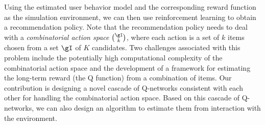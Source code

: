 \documentclass{article} %
\newcommand{\shuang}[1]{{\color{purple}{\bf\sf[ #1]}}}
\newcommand{\Li}[1]{{\color{cyan}{\bf\sf [Li: #1]}}}
\begin{document}
Using the estimated user behavior model and the corresponding reward function as the simulation environment, we can then use reinforcement learning to obtain a recommendation policy. Note that the recommendation policy needs to deal with a {\it combinatorial action space} $\gI \choose k$, where each action is a set of $k$ items chosen from a \Li{\st{larger} large} set $\gI$ of $K$ candidates. \Li{$K$ is not defined.}
Two challenges associated with this problem include the potentially high computational complexity of the combinatorial action space and the development of a framework for estimating the long-term reward (the Q function) from a combination of items. Our contribution is designing a novel cascade of Q-networks consistent with each other for handling the combinatorial action space. Based on this cascade of Q-networks, we can also design an algorithm to estimate them from interaction with the environment.




\end{document}
